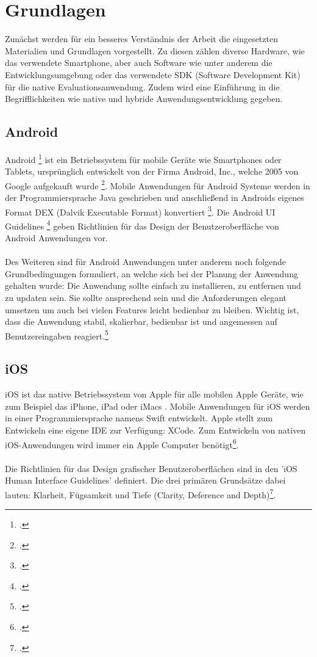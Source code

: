 \chapter{Grundlagen}

Zunächst werden für ein besseres Verständnis der Arbeit die eingesetzten Materialien und Grundlagen vorgestellt. Zu diesen zählen diverse Hardware, wie das verwendete Smartphone, aber auch Software wie unter anderem die Entwicklungsumgebung oder das verwendete SDK (Software Development Kit) für die native Evaluationsanwendung. Zudem wird eine Einführung in die Begrifflichkeiten wie native und hybride Anwendungsentwicklung gegeben.

\section{Android} \label{AndroidPlattform}

Android \footcite{Android} ist ein Betriebssystem für mobile Geräte wie Smartphones oder Tablets, ursprünglich entwickelt von der Firma Android, Inc., welche 2005 von Google aufgekauft wurde \footcite{AndroidHistory}. Mobile Anwendungen für Android Systeme werden in der Programmiersprache Java geschrieben und anschließend in Androids eigenes Format DEX (Dalvik Executable Format) konvertiert \footcite{AndroidCookbook}. Die Android UI Guidelines \footcite{AndroidGuidelines} geben Richtlinien für das Design der Benutzeroberfläche von Android Anwendungen vor.
\\
\\
Des Weiteren sind für Android Anwendungen unter anderem noch folgende Grundbedingungen formuliert, an welche sich bei der Planung der Anwendung gehalten wurde: Die Anwendung sollte einfach zu installieren, zu entfernen und zu updaten sein. Sie sollte ansprechend sein und die Anforderungen elegant umsetzen um auch bei vielen Features leicht bedienbar zu bleiben. Wichtig ist, dass die Anwendung stabil, skalierbar, bedienbar ist und angemessen auf Benutzereingaben reagiert.\footcite{AndroidCookbook}

\section{iOS}

iOS ist das native Betriebssystem von Apple für alle mobilen Apple Geräte, wie zum Beispiel das iPhone, iPad oder iMacs . Mobile Anwendungen für iOS werden in einer Programmiersprache  namens Swift entwickelt. Apple stellt zum Entwickeln eine eigene IDE zur Verfügung: XCode. Zum Entwickeln von nativen iOS-Anwendungen wird immer ein Apple Computer benötigt\footcite{iOS}. 
\\
\\
Die Richtlinien für das Design grafischer Benutzeroberflächen sind in den 'iOS Human Interface Guidelines' definiert. Die drei primären Grundsätze dabei lauten: Klarheit, Fügsamkeit und Tiefe (Clarity, Deference and Depth)\footcite{iOSGUI}. 

